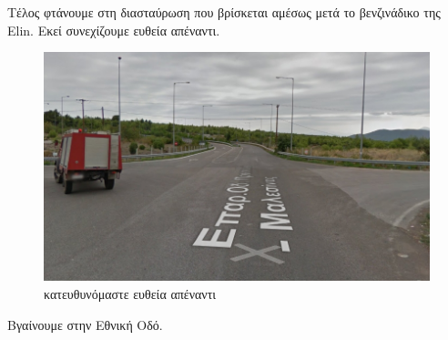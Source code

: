 Τέλος φτάνουμε στη διασταύρωση που βρίσκεται αμέσως μετά το βενζινάδικο της Elin. Εκεί συνεχίζουμε ευθεία απέναντι.
\begin{figure}[H]
\includegraphics[width=\textwidth]{images/lamia-athina/tragana/tragana_014.jpg} 
\caption{κατευθυνόμαστε ευθεία απέναντι}
\end{figure}
Βγαίνουμε στην Εθνική Οδό.